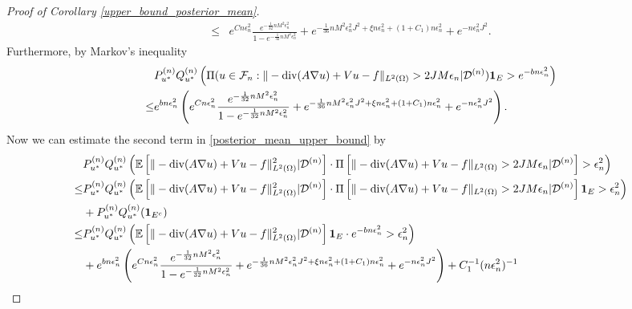 \documentclass{article}
\newcommand{\E}{\mathbb{E}}
\newcommand{\F}{\mathcal{F}}
\newcommand{\D}{\mathcal{D}}
\renewcommand{\div}{\textnormal{div}}
\theoremstyle{plain}
\theoremstyle{definition}
\theoremstyle{remark}
\begin{document}
\begin{proof}[Proof of Corollary \ref{upper_bound_posterior_mean}]
\begin{equation}
\begin{aligned}
        \leq & e^{C n \epsilon_n^2} \frac{e^{-\frac{1}{32}n M^2 \epsilon_n^2}}{1 - e^{-\frac{1}{32}n M^2 \epsilon_n^2}} + e^{-\frac{1}{36} n M^2 \epsilon_{n}^2 J^2 + \xi n\epsilon_n^2 + (1+C_1) n \epsilon_n^2} + e^{- n\epsilon_n^2 J^2}. 
    \end{aligned}
\end{equation}
Furthermore, by Markov's inequality 
\begin{equation} \label{markov_upper_bound}
    \begin{aligned}
        & P_{u^*}^{(n)} Q_{u^*}^{(n)} \left(\Pi(u \in \F_n: \|-\div(A \nabla u) + V u -f\|_{L^2(\Omega)} > 2 J M \epsilon_n| \D^{(n)}) \mathbf{1}_E > e^{-b n\epsilon_n^2} \right) \\
        \leq & e^{b n\epsilon_n^2} \left(e^{C n \epsilon_n^2} \frac{e^{-\frac{1}{32}n M^2 \epsilon_n^2}}{1 - e^{-\frac{1}{32}n M^2 \epsilon_n^2}} + e^{-\frac{1}{36} n M^2 \epsilon_{n}^2 J^2 + \xi n\epsilon_n^2 + (1+C_1) n \epsilon_n^2} + e^{-  n\epsilon_n^2 J^2}\right). 
    \end{aligned}
\end{equation}
Now we can estimate the second term in \eqref{posterior_mean_upper_bound} by 
\begin{equation} \label{probability_second_term}
    \begin{aligned}
        & P_{u^*}^{(n)} Q_{u^*}^{(n)} \left(\E \left[\|-\div(A \nabla u) + V u -f\|_{L^2(\Omega)}^2 | \D^{(n)}\right] \cdot \Pi \left[ \|-\div(A \nabla u) + V u -f\|_{L^2(\Omega)} > 2 J M \epsilon_n | \D^{(n)} \right] > \epsilon_n^2 \right) \\
        \leq &  P_{u^*}^{(n)} Q_{u^*}^{(n)} \left(\E \left[ \|-\div(A \nabla u) + V u -f\|_{L^2(\Omega)}^2 | \D^{(n)}\right] \cdot \Pi \left[ \|-\div(A \nabla u) + V u -f\|_{L^2(\Omega)} >2 J M \epsilon_n | \D^{(n)} \right] \mathbf{1}_E > \epsilon_n^2 \right) \\ & + P_{u^*}^{(n)} Q_{u^*}^{(n)} (\mathbf{1}_{E^c}) \\
        \leq & P_{u^*}^{(n)} Q_{u^*}^{(n)} \left(\E \left[ \|-\div(A \nabla u) + V u -f\|_{L^2(\Omega)}^2 | \D^{(n)}\right] \mathbf{1}_E  \cdot e^{-b n\epsilon_n^2 } > \epsilon_n^2  \right) \\
        & + e^{b n\epsilon_n^2} \left(e^{C n \epsilon_n^2} \frac{e^{-\frac{1}{32}n M^2 \epsilon_n^2}}{1 - e^{-\frac{1}{32}n M^2 \epsilon_n^2}} + e^{-\frac{1}{36} n M^2 \epsilon_{n}^2 J^2 + \xi n\epsilon_n^2 + (1+C_1) n \epsilon_n^2} + e^{- n\epsilon_n^2 J^2}\right) + C_1^{-1} (n \epsilon_n^2)^{-1}\\

\end{aligned}
\end{equation}
\end{proof}
\end{document}
